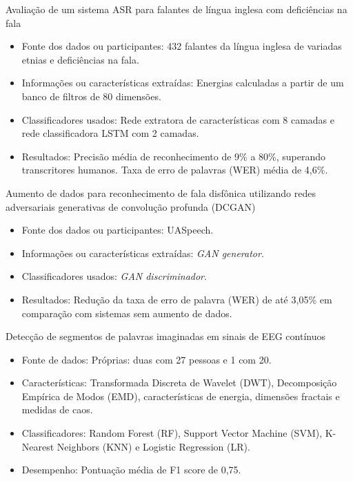 \documentclass{beamer}
\begin{document}
	\begin{frame}{Avaliação de um sistema ASR para falantes de língua inglesa com deficiências na fala \cite{WOS:000841879504172}}
		\begin{itemize}
			\item Fonte dos dados ou participantes: 432 falantes da língua inglesa de variadas etnias e deficiências na fala.
			\item Informações ou características extraídas: Energias calculadas a partir de um banco de filtros de 80 dimensões.
			\item Classificadores usados: Rede extratora de características com 8 camadas e rede classificadora LSTM com 2 camadas.
			\item Resultados: Precisão média de reconhecimento de 9\% a 80\%, superando transcritores humanos. Taxa de erro de palavras (WER) média de 4,6\%.
		\end{itemize}
		
	\end{frame}

	
	\begin{frame}{Aumento de dados para reconhecimento de fala disfônica utilizando redes adversariais generativas de convolução profunda (DCGAN) \cite{jin21_interspeech}}
		\begin{itemize}
			\item Fonte dos dados ou participantes: UASpeech.
			\item Informações ou características extraídas: \textit{GAN generator}.
			\item Classificadores usados: \textit{GAN discriminador}.
			\item Resultados: Redução da taxa de erro de palavra (WER) de até 3,05\% em comparação com sistemas sem aumento de dados.
		\end{itemize}
		
	\end{frame}


	\begin{frame}{Detecção de segmentos de palavras imaginadas em sinais de EEG contínuos \cite{WOS:000614122200021}}
		\begin{itemize}
			\item Fonte de dados: Próprias: duas com 27 pessoas e 1 com 20.
			\item Características: Transformada Discreta de Wavelet (DWT), Decomposição Empírica de Modos (EMD), características de energia, dimensões fractais e medidas de caos.
			\item Classificadores: Random Forest (RF), Support Vector Machine (SVM), K-Nearest Neighbors (KNN) e Logistic Regression (LR).
			\item Desempenho: Pontuação média de F1 score de 0,75.
		\end{itemize}
		
	\end{frame}
\end{document}
